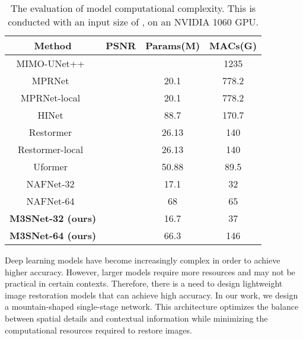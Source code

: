 \documentclass[sn-mathphys,Numbered]{sn-jnl}
\theoremstyle{thmstyleone}\newtheorem{theorem}{Theorem}\newtheorem{proposition}[theorem]{Proposition}
\theoremstyle{thmstyletwo}\newtheorem{example}{Example}\newtheorem{remark}{Remark}
\theoremstyle{thmstylethree}\newtheorem{definition}{Definition}
\begin{document}
\begin{table}
\caption{The evaluation of model computational complexity. This is conducted with an input size of , on an NVIDIA 1060 GPU. \label{tb:04}}

\begin{tabular}{ccccc}
\hline
\multicolumn{2}{c}{Method} & \multicolumn{1}{c}{PSNR} & \multicolumn{1}{c}{Params(M)} & \multicolumn{1}{c}{MACs(G)} 
\\
\hline\hline
\multicolumn{2}{c}{MIMO-UNet++~\cite{2021Rethinking}}  & \multicolumn{1}{c}{} & \multicolumn{1}{c}{}  & \multicolumn{1}{c}{1235} 
\\
\multicolumn{2}{c}{MPRNet~\cite{Zamir2021MPRNet}}  & \multicolumn{1}{c}{} & \multicolumn{1}{c}{20.1}  & \multicolumn{1}{c}{778.2}  
\\
\multicolumn{2}{c}{MPRNet-local~\cite{Zamir2021MPRNet}}  & \multicolumn{1}{c}{} & \multicolumn{1}{c}{20.1}  & \multicolumn{1}{c}{778.2}  
\\
\multicolumn{2}{c}{HINet~\cite{Chen_2021_CVPR}}  & \multicolumn{1}{c}{} & \multicolumn{1}{c}{88.7}  & \multicolumn{1}{c}{170.7} 
\\
\multicolumn{2}{c}{Restormer~\cite{Zamir2021Restormer}}  & \multicolumn{1}{c}{} & \multicolumn{1}{c}{26.13}  & \multicolumn{1}{c}{140} 
\\
\multicolumn{2}{c}{Restormer-local~\cite{Zamir2021Restormer}}  & \multicolumn{1}{c}{} & \multicolumn{1}{c}{26.13}  & \multicolumn{1}{c}{140} 
\\
\multicolumn{2}{c}{Uformer~\cite{Wang_2022_CVPR}}  & \multicolumn{1}{c}{} & \multicolumn{1}{c}{50.88}  & \multicolumn{1}{c}{89.5} 
\\
\hline
\multicolumn{2}{c}{NAFNet-32~\cite{chen2022simple}}  & \multicolumn{1}{c}{} & \multicolumn{1}{c}{17.1}  & \multicolumn{1}{c}{32}
\\
\multicolumn{2}{c}{NAFNet-64~\cite{chen2022simple}}  & \multicolumn{1}{c}{} & \multicolumn{1}{c}{68}  & \multicolumn{1}{c}{65}
\\
\hline
\multicolumn{2}{c}{\textbf{M3SNet-32 (ours)}}  & \multicolumn{1}{c}{} & \multicolumn{1}{c}{16.7}  & \multicolumn{1}{c}{37}
\\
\multicolumn{2}{c}{\textbf{M3SNet-64 (ours)}}  & \multicolumn{1}{c}{} & \multicolumn{1}{c}{66.3}  & \multicolumn{1}{c}{146}
\\
\hline
\end{tabular}
\end{table}
Deep learning models have become increasingly complex in order to achieve higher accuracy. However, larger models require more resources and may not be practical in certain contexts. Therefore, there is a need to design lightweight image restoration models that can achieve high accuracy. In our work, we design a mountain-shaped single-stage network. This architecture optimizes the balance between spatial details and contextual information while minimizing the computational resources required to restore images.
\end{document}
